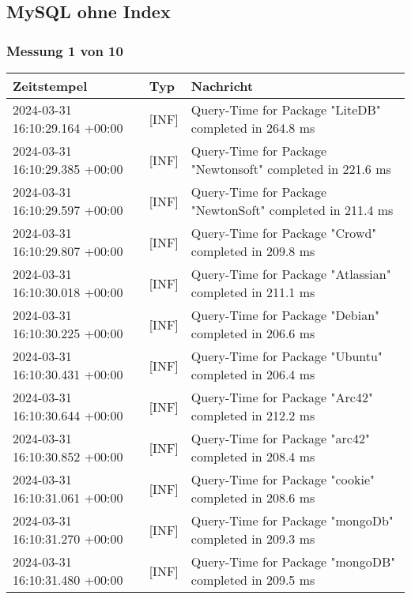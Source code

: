 \subsection{MySQL ohne Index} \label{subsec:MySQLOhneIndex}
    \subsubsection{Messung 1 von 10} \label{subsubsec:MySQLOhneIndex1von10}
        {
            {\small
                \begin{tabularx}{\textwidth}{|l|l|X|}
                    \hline
                    \textbf{Zeitstempel} & \textbf{Typ} & \textbf{Nachricht} \\
                    \hline
                    \endhead
                    2024-03-31 16:10:29.164 +00:00 & [INF] & Query-Time for Package "LiteDB" completed in 264.8 ms \\
                    2024-03-31 16:10:29.385 +00:00 & [INF] & Query-Time for Package "Newtonsoft" completed in 221.6 ms \\
                    2024-03-31 16:10:29.597 +00:00 & [INF] & Query-Time for Package "NewtonSoft" completed in 211.4 ms \\
                    2024-03-31 16:10:29.807 +00:00 & [INF] & Query-Time for Package "Crowd" completed in 209.8 ms \\
                    2024-03-31 16:10:30.018 +00:00 & [INF] & Query-Time for Package "Atlassian" completed in 211.1 ms \\
                    2024-03-31 16:10:30.225 +00:00 & [INF] & Query-Time for Package "Debian" completed in 206.6 ms \\
                    2024-03-31 16:10:30.431 +00:00 & [INF] & Query-Time for Package "Ubuntu" completed in 206.4 ms \\
                    2024-03-31 16:10:30.644 +00:00 & [INF] & Query-Time for Package "Arc42" completed in 212.2 ms \\
                    2024-03-31 16:10:30.852 +00:00 & [INF] & Query-Time for Package "arc42" completed in 208.4 ms \\
                    2024-03-31 16:10:31.061 +00:00 & [INF] & Query-Time for Package "cookie" completed in 208.6 ms \\
                    2024-03-31 16:10:31.270 +00:00 & [INF] & Query-Time for Package "mongoDb" completed in 209.3 ms \\
                    2024-03-31 16:10:31.480 +00:00 & [INF] & Query-Time for Package "mongoDB" completed in 209.5 ms \\

\end{tabularx}}}
